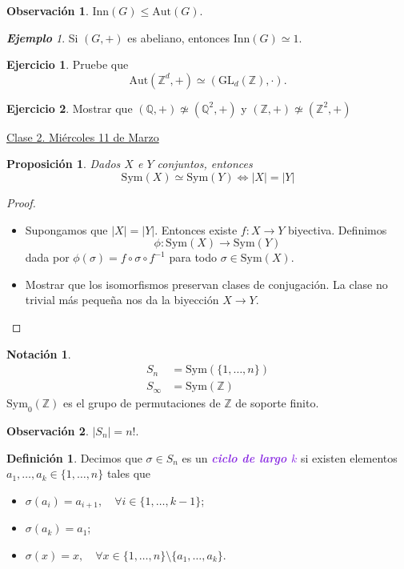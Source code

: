 \documentclass{article}
\newtheorem{proposition}[theorem]{Proposición}
\theoremstyle{definition}
\newtheorem{definition}[theorem]{Definición}
\newtheorem{exercise}{Ejercicio}
\newtheorem*{notation}{Notación}
\newtheorem*{obs}{Observación}
\theoremstyle{remark}
\newtheorem{example}[theorem]{\textbf{Ejemplo}}
\numberwithin{equation}{section}
\newcommand{\Q}{\mathbb{Q}}
\newcommand{\Z}{\mathbb{Z}}
\newcommand{\oo}{\infty}
\renewcommand{\c}{\cdot}
\newcommand{\GL}{\mathrm{GL}}
\newcommand{\Sym}{\mathrm{Sym}}
\newcommand{\Aut}{\mathrm{Aut}}
\newcommand{\Inn}{\mathrm{Inn}}
\newcommand{\abs}[1]{\left| #1 \right|}
\newcommand{\wea}[1]{\textcolor{BlueViolet}{\textbf{\emph{#1}}}}
\newcommand{\fecha}[1]{\begin{flushright} \underline{#1} \end{flushright}}
\begin{document}
\begin{obs}
  $\Inn(G) \leqslant \Aut(G)$.
\end{obs}

\begin{example}
  Si $(G,+)$ es abeliano, entonces $\Inn(G) \simeq 1$.
\end{example}

\begin{exercise}
  Pruebe que $$\Aut(\Z^d,+) \simeq (\GL_d(\Z), \c).$$
\end{exercise}


\begin{exercise}
  Mostrar que $(\Q,+) \not\simeq (\Q^2,+)$ y $(\Z,+) \not\simeq (\Z^2,+)$
\end{exercise}

\newpage
\fecha{Clase 2. Miércoles 11 de Marzo}

\begin{proposition}
  Dados $X$ e $Y$ conjuntos, entonces
  \[\Sym(X) \simeq \Sym(Y) \iff |X| = |Y|\]
\end{proposition}
\begin{proof}
  \
  \begin{itemize}
    \item \boxed{\impliedby} Supongamos que $|X| = |Y|$. Entonces existe $f \colon X \to Y$ biyectiva. Definimos $$\phi \colon \Sym(X) \to \Sym(Y)$$ dada por $\phi(\sigma) = f \circ \sigma \circ f^{-1}$ para todo $\sigma \in \Sym(X)$.
    \item \boxed{\implies} Mostrar que los isomorfismos preservan clases de conjugación. La clase no trivial más pequeña nos da la biyección $X \to Y$. %
  \end{itemize}
\end{proof}

\begin{notation}
  \begin{align*}
    S_n &= \Sym(\{1,\dots,n\}) \\
    S_\oo &= \Sym(\Z)
  \end{align*}
  $\Sym_0(\Z)$ es el grupo de permutaciones de $\Z$ de soporte finito.
\end{notation}

\begin{obs}
  $\abs{S_n} = n!$.
\end{obs}

\begin{definition}
  Decimos que $\sigma \in S_n$ es un \wea{ciclo de largo $k$} si existen elementos $a_1,\dots,a_k \in \{1,\dots,n\}$ tales que
  \begin{itemize}
    \item $\sigma(a_i) = a_{i+1}, \quad \forall i \in \{1,\dots,k-1\}$;
    \item $\sigma(a_k) = a_1$;
    \item $\sigma(x) = x, \quad \forall x \in \{1,\dots,n\} \setminus \{a_1,\dots,a_k\}$.
  \end{itemize}
\end{definition}
\end{document}
